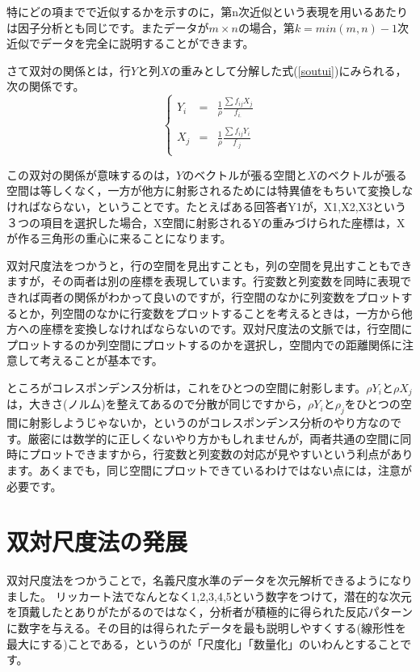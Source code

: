 \documentclass{ltjsbook}
\begin{document}
特にどの項までで近似するかを示すのに，第n次近似という表現を用いるあたりは因子分析とも同じです。またデータが$m \times n$の場合，第$k=min(m,n)-1$次近似でデータを完全に説明することができます。

さて双対の関係とは，行$Y$と列$X$の重みとして分解した式(\ref{soutui})にみられる，次の関係です。
\begin{equation}
	\label{soutui}
	\left \{
	\begin{array}{ccc}
		Y_{i} & = & \displaystyle{\frac{1}{\rho}\frac{\sum f_{ij}X_{j}}{f_{i.}}} \\
		\\
		X_{j} & = & \displaystyle{\frac{1}{\rho}\frac{\sum f_{ij}Y_{i}}{f_{.j}}} \\
	\end{array}
	\right.
\end{equation}

この双対の関係が意味するのは，$Y$のベクトルが張る空間と$X$のベクトルが張る空間は等しくなく，一方が他方に射影されるためには特異値をもちいて変換しなければならない，ということです。たとえばある回答者Y1が，X1,X2,X3という３つの項目を選択した場合，X空間に射影されるYの重みづけられた座標は，Xが作る三角形の重心に来ることになります。

双対尺度法をつかうと，行の空間を見出すことも，列の空間を見出すこともできますが，その両者は別の座標を表現しています。行変数と列変数を同時に表現できれば両者の関係がわかって良いのですが，行空間のなかに列変数をプロットするとか，列空間のなかに行変数をプロットすることを考えるときは，一方から他方への座標を変換しなければならないのです。双対尺度法の文脈では，行空間にプロットするのか列空間にプロットするのかを選択し，空間内での距離関係に注意して考えることが基本です。

ところがコレスポンデンス分析は，これをひとつの空間に射影します。$\rho Y_{i}$と$\rho X_{j}$は，大きさ(ノルム)を整えてあるので分散が同じですから，$\rho Y_{i}$と$\rho _{j}$をひとつの空間に射影しようじゃないか，というのがコレスポンデンス分析のやり方なのです。厳密には数学的に正しくないやり方かもしれませんが，両者共通の空間に同時にプロットできますから，行変数と列変数の対応が見やすいという利点があります。あくまでも，同じ空間にプロットできているわけではない点には，注意が必要です。

\section{双対尺度法の発展}
双対尺度法をつかうことで，名義尺度水準のデータを次元解析できるようになりました。
リッカート法でなんとなく1,2,3,4,5という数字をつけて，潜在的な次元を頂戴したとありがたがるのではなく，分析者が積極的に得られた反応パターンに数字を与える。その目的は得られたデータを最も説明しやすくする(線形性を最大にする)ことである，というのが「尺度化」「数量化」のいわんとすることです。
\end{document}
